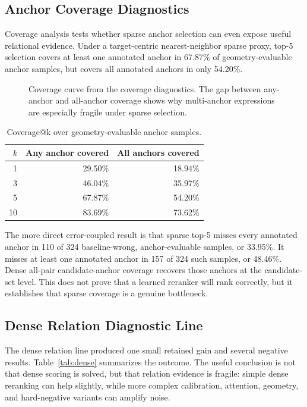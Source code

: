 \subsection{Anchor Coverage Diagnostics}

Coverage analysis tests whether sparse anchor selection can even expose useful relational evidence. Under a target-centric nearest-neighbor sparse proxy, top-5 selection covers at least one annotated anchor in 67.87\% of geometry-evaluable anchor samples, but covers all annotated anchors in only 54.20\%.

\begin{figure}[!htbp]
  \centering
  
  \caption{Coverage curve from the coverage diagnostics. The gap between any-anchor and all-anchor coverage shows why multi-anchor expressions are especially fragile under sparse selection.}
  \label{fig:coverage}
\end{figure}

\begin{table}[!htbp]
\centering
\small
\caption{Coverage@k over geometry-evaluable anchor samples.}
\label{tab:coverage}
\begin{tabular}{rrr}
\toprule
$k$ & Any anchor covered & All anchors covered \\
\midrule
1 & 29.50\% & 18.94\% \\
3 & 46.04\% & 35.97\% \\
5 & 67.87\% & 54.20\% \\
10 & 83.69\% & 73.62\% \\
\bottomrule
\end{tabular}
\end{table}

The more direct error-coupled result is that sparse top-5 misses every annotated anchor in 110 of 324 baseline-wrong, anchor-evaluable samples, or 33.95\%. It misses at least one annotated anchor in 157 of 324 such samples, or 48.46\%. Dense all-pair candidate-anchor coverage recovers those anchors at the candidate-set level. This does not prove that a learned reranker will rank correctly, but it establishes that sparse coverage is a genuine bottleneck.

\subsection{Dense Relation Diagnostic Line}

The dense relation line produced one small retained gain and several negative results. Table~\ref{tab:dense} summarizes the outcome. The useful conclusion is not that dense scoring is solved, but that relation evidence is fragile: simple dense reranking can help slightly, while more complex calibration, attention, geometry, and hard-negative variants can amplify noise.

